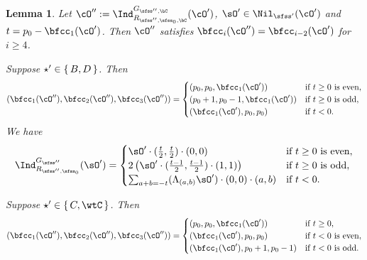 \documentclass[12pt,a4paper]{amsart}
\numberwithin{equation}{section}
\newtheorem{lem}[thm]{Lemma}
\theoremstyle{remark}
\def\cOp{\cO^{\prime}}
\def\cOpp{\cO^{\prime\prime}}
\begin{document}
\begin{lem}\label{lem:ind}
Let $\cOpp:=\indss(\cOp)$, $\sOp\in
\Nil_{\sfss'}(\cOp)$ and $t = p_0-\bfcc_1(\cOp)$.
 Then $\cOpp$ satisfies
    $\bfcc_i(\cOpp)=\bfcc_{i-2}(\cOp)$ for $i\geq 4$.
  \begin{enuma}
    \item Suppose $\star'\in \set{B,D}$.
    Then
    \[
      (\bfcc_1(\cOpp), \bfcc_2(\cOpp),\bfcc_3(\cOpp))
      =\begin{cases}
        (\lll,\lll,\bfcc_1(\cOp))     & \text{if $t\geq 0$ is even}, \\
          (\lll+1,\lll-1,\bfcc_1(\cOp)) & \text{if $t\geq 0$ is odd},  \\
          (\bfcc_1(\cOp),\lll,\lll)     & \text{if $t<0$}.             \\
      \end{cases}
    \]
    We have
    \[
      \indsss(\sOp) =
      \begin{cases}
        \sOp\cdot (\frac{t}{2},\frac{t}{2})\cdot (0,0)
         & \text{if $t \geq 0$ is even}, \\
        2  \left(\sOp\cdot (\frac{t-1}{2},\frac{t-1}{2})\cdot (1,1) \right)
         & \text{if $t\geq 0$ is odd},   \\
        \sum_{\po+\qo=-t}
        (\Lambda_{(\po,\qo)}\sOp)\cdot (0,0)\cdot (\po,\qo)
         & \text{if $t<0$}.              \\
      \end{cases}
    \]
    \item Suppose $\star'\in \set{C,\wtC}$.
    Then
    \[
      (\bfcc_1(\cOpp), \bfcc_2(\cOpp),\bfcc_3(\cOpp))
      =\begin{cases}
        (\lll,\lll,\bfcc_1(\cOp))     & \text{if $t\geq 0$}, \\
        (\bfcc_1(\cOp),\lll,\lll) & \text{if $t < 0$ is even},  \\
        (\bfcc_1(\cOp),\lll+1,\lll-1)     & \text{if $t<0$ is odd}.             \\
      \end{cases}
    \]


\end{enuma}
\end{lem}
\end{document}
